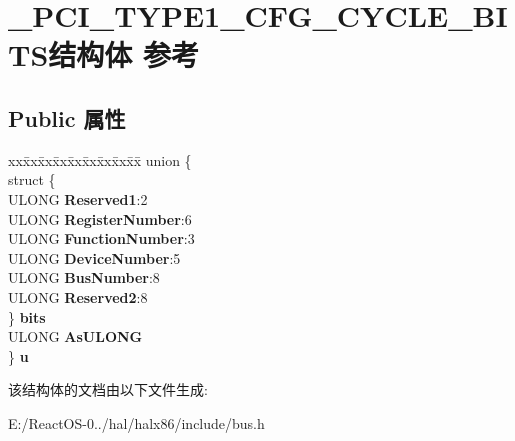 \hypertarget{struct___p_c_i___t_y_p_e1___c_f_g___c_y_c_l_e___b_i_t_s}{}\section{\+\_\+\+P\+C\+I\+\_\+\+T\+Y\+P\+E1\+\_\+\+C\+F\+G\+\_\+\+C\+Y\+C\+L\+E\+\_\+\+B\+I\+T\+S结构体 参考}
\label{struct___p_c_i___t_y_p_e1___c_f_g___c_y_c_l_e___b_i_t_s}
\subsection*{Public 属性}
\begin{DoxyCompactItemize}
\item 
\mbox{\label{struct___p_c_i___t_y_p_e1___c_f_g___c_y_c_l_e___b_i_t_s_a2d92e9e87d61dbfa3ee03a6a7772340d}} 
\begin{tabbing}
xx\=xx\=xx\=xx\=xx\=xx\=xx\=xx\=xx\=\kill
union \{\\
\>struct \{\\
\>\>ULONG {\bfseries Reserved1}:2\\
\>\>ULONG {\bfseries RegisterNumber}:6\\
\>\>ULONG {\bfseries FunctionNumber}:3\\
\>\>ULONG {\bfseries DeviceNumber}:5\\
\>\>ULONG {\bfseries BusNumber}:8\\
\>\>ULONG {\bfseries Reserved2}:8\\
\>\} {\bfseries bits}\\
\>ULONG {\bfseries AsULONG}\\
\} {\bfseries u}\\

\end{tabbing}\end{DoxyCompactItemize}


该结构体的文档由以下文件生成\+:\begin{DoxyCompactItemize}
\item 
E\+:/\+React\+O\+S-\/0../hal/halx86/include/bus.\+h\end{DoxyCompactItemize}
